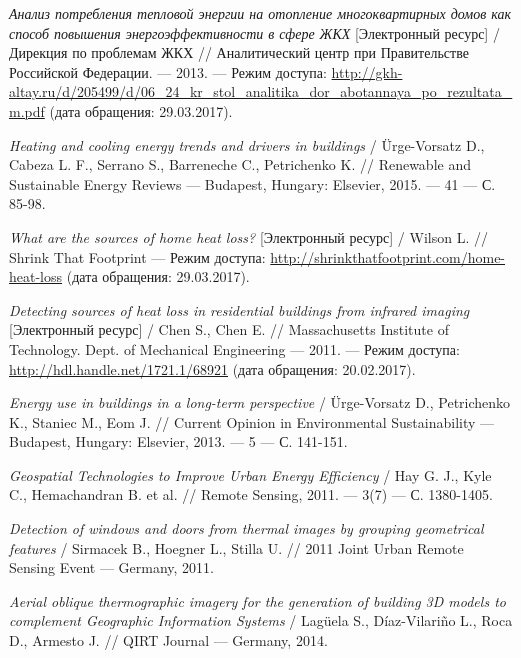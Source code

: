 \begin{thebibliography}{00}
	\emph{Анализ потребления тепловой энергии на отопление многоквартирных домов как способ повышения энергоэффективности в сфере ЖКХ} [Электронный ресурс] / Дирекция по проблемам ЖКХ //
	Аналитический центр при Правительстве Российской Федерации. --- 2013. --- Режим доступа:
	\url{http://gkh-altay.ru/d/205499/d/06_24_kr_stol_analitika_dor_abotannaya_po_rezultata_m.pdf} (дата обращения: 29.03.2017).

	\emph{Heating and cooling energy trends and drivers in buildings} / Ürge-Vorsatz D., Cabeza L. F., Serrano S., Barreneche C., Petrichenko K. //
	Renewable and Sustainable Energy Reviews --- Budapest, Hungary: Elsevier, 2015. --- \No{} 41 --- С. 85-98.

	\emph{What are the sources of home heat loss?} [Электронный ресурс] / Wilson L. //
	Shrink That Footprint --- Режим доступа: \url{http://shrinkthatfootprint.com/home-heat-loss} (дата обращения: 29.03.2017).

	\emph{Detecting sources of heat loss in residential buildings from infrared imaging} [Электронный ресурс] / Chen S., Chen E. //
	Massachusetts Institute of Technology. Dept. of Mechanical Engineering --- 2011. --- Режим доступа: \url{http://hdl.handle.net/1721.1/68921} (дата обращения: 20.02.2017).

	\emph{Energy use in buildings in a long-term perspective} / Ürge-Vorsatz D., Petrichenko K., Staniec M., Eom J. //
	Current Opinion in Environmental Sustainability --- Budapest, Hungary: Elsevier, 2013. --- \No{} 5 --- С. 141-151.

	\emph{Geospatial Technologies to Improve Urban Energy Efficiency} / Hay G. J., Kyle C., Hemachandran B. et al. // Remote Sensing, 2011. --- \No{} 3(7) --- С. 1380-1405.

	\emph{Detection of windows and doors from thermal images by grouping geometrical features} / Sirmacek B., Hoegner L., Stilla U. //
	2011 Joint Urban Remote Sensing Event --- Germany, 2011.

	\emph{Aerial oblique thermographic imagery for the generation of building 3D models to complement Geographic Information Systems} /  Lagüela S., Díaz-Vilariño L., Roca D., Armesto J. //
	QIRT Journal --- Germany, 2014.


\end{thebibliography}
